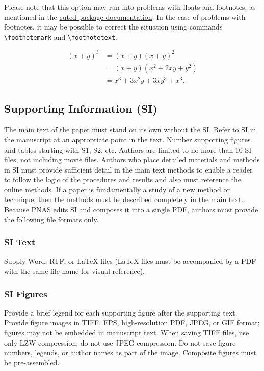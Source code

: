 \documentclass[9pt,twocolumn,twoside,]{pnas-new}
\begin{document}
Please note that this option may run into problems with floats and
footnotes, as mentioned in the \href{http://texdoc.net/pkg/cuted}{cuted
package documentation}. In the case of problems with footnotes, it may
be possible to correct the situation using commands
\texttt{\textbackslash{}footnotemark} and
\texttt{\textbackslash{}footnotetext}.

\[\begin{aligned}
(x+y)^3&=(x+y)(x+y)^2\\
       &=(x+y)(x^2+2xy+y^2) \label{eqn:example} \\
       &=x^3+3x^2y+3xy^3+x^3. 
\end{aligned}\]

\subsection*{Supporting Information
(SI)}\label{supporting-information-si}

The main text of the paper must stand on its own without the SI. Refer
to SI in the manuscript at an appropriate point in the text. Number
supporting figures and tables starting with S1, S2, etc. Authors are
limited to no more than 10 SI files, not including movie files. Authors
who place detailed materials and methods in SI must provide sufficient
detail in the main text methods to enable a reader to follow the logic
of the procedures and results and also must reference the online
methods. If a paper is fundamentally a study of a new method or
technique, then the methods must be described completely in the main
text. Because PNAS edits SI and composes it into a single PDF, authors
must provide the following file formats only.

\subsubsection*{SI Text}\label{si-text}

Supply Word, RTF, or LaTeX files (LaTeX files must be accompanied by a
PDF with the same file name for visual reference).

\subsubsection*{SI Figures}\label{si-figures}

Provide a brief legend for each supporting figure after the supporting
text. Provide figure images in TIFF, EPS, high-resolution PDF, JPEG, or
GIF format; figures may not be embedded in manuscript text. When saving
TIFF files, use only LZW compression; do not use JPEG compression. Do
not save figure numbers, legends, or author names as part of the image.
Composite figures must be pre-assembled.
\end{document}
